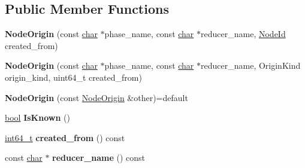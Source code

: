 \subsection*{Public Member Functions}
\begin{DoxyCompactItemize}
\item 
\mbox{\label{classv8_1_1internal_1_1compiler_1_1NodeOrigin_a154b4fa26b7d3a7955fb99774afff3aa}} 
{\bfseries Node\+Origin} (const \mbox{\hyperlink{classchar}{char}} $\ast$phase\+\_\+name, const \mbox{\hyperlink{classchar}{char}} $\ast$reducer\+\_\+name, \mbox{\hyperlink{classuint32__t}{Node\+Id}} created\+\_\+from)
\item 
\mbox{\label{classv8_1_1internal_1_1compiler_1_1NodeOrigin_a5b4d667d161dad66d74497930724c97c}} 
{\bfseries Node\+Origin} (const \mbox{\hyperlink{classchar}{char}} $\ast$phase\+\_\+name, const \mbox{\hyperlink{classchar}{char}} $\ast$reducer\+\_\+name, Origin\+Kind origin\+\_\+kind, uint64\+\_\+t created\+\_\+from)
\item 
\mbox{\label{classv8_1_1internal_1_1compiler_1_1NodeOrigin_ae89671786a42fb51606d0ac6e6468583}} 
{\bfseries Node\+Origin} (const \mbox{\hyperlink{classv8_1_1internal_1_1compiler_1_1NodeOrigin}{Node\+Origin}} \&other)=default
\item 
\mbox{\label{classv8_1_1internal_1_1compiler_1_1NodeOrigin_ab732886e9b2982801ba0744e5a49aa5d}} 
\mbox{\hyperlink{classbool}{bool}} {\bfseries Is\+Known} ()
\item 
\mbox{\label{classv8_1_1internal_1_1compiler_1_1NodeOrigin_af8b008b34f32364e39134bcbfcb3cb01}} 
\mbox{\hyperlink{classint64__t}{int64\+\_\+t}} {\bfseries created\+\_\+from} () const
\item 
\mbox{\label{classv8_1_1internal_1_1compiler_1_1NodeOrigin_a1124edae4fe7c5daaac83c48bf829ea5}} 
const \mbox{\hyperlink{classchar}{char}} $\ast$ {\bfseries reducer\+\_\+name} () const
\item 
\mbox{\label{classv8_1_1internal_1_1compiler_1_1NodeOrigin_adcb5e5e599a13d74150fc81aed6ddbbe}} 

\end{DoxyCompactItemize}
